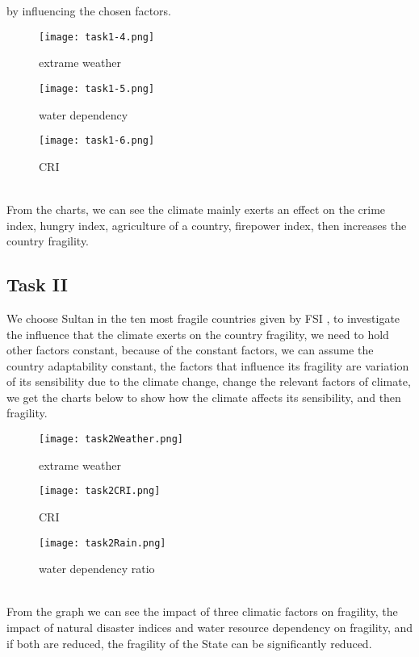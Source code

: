 \documentclass{mcmthesis}
\begin{document}
by influencing the chosen factors.
\begin{figure}[h]
  \centering
  \begin{minipage}[h]{0.3\textwidth}
  \centering
  \texttt{[image: task1-4.png]}
  \caption{extrame weather}
  \end{minipage}
  \begin{minipage}[h]{0.3\textwidth}
  \centering
  \texttt{[image: task1-5.png]}
  \caption{water dependency}
  \end{minipage}    
  \begin{minipage}[h]{0.3\textwidth}
  \centering
  \texttt{[image: task1-6.png]}
  \caption{CRI}
  \end{minipage}  
\end{figure}\\
From the charts, we can see the climate mainly exerts 
an effect on the crime index, hungry index, agriculture of 
a country, firepower index, then increases the 
country fragility.
\subsection{Task II}
We choose Sultan in the ten most fragile countries given by FSI , 
to investigate the influence that the climate exerts on the country fragility, 
we need to hold other factors constant, because of the constant factors, 
we can assume the country adaptability constant, the factors that influence 
its fragility are variation of its sensibility due to the climate change, 
change the relevant factors of climate, we get the charts below to show 
how the climate affects its sensibility, and then fragility.
\begin{figure}[h]
  \begin{minipage}[h]{0.48\textwidth}
  \flushleft
  \texttt{[image: task2Weather.png]}
  \caption{extrame weather}
  \end{minipage}
  \begin{minipage}[h]{0.48\textwidth}
  \flushright
  \texttt{[image: task2CRI.png]}
  \caption{CRI}
  \end{minipage} 
\end{figure}
\begin{figure}[h]
  \begin{minipage}[h]{0.50\textwidth}
  \flushleft
  \texttt{[image: task2Rain.png]}
  \caption{water dependency ratio}
  \end{minipage}
\end{figure} \\
From the graph we can see the impact of three climatic factors on fragility, 
the impact of natural disaster indices and water resource dependency on fragility, 
and if both are reduced, the fragility of the State can be significantly reduced.
\end{document}
